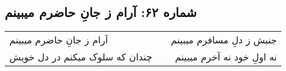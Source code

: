 \begin{center}
\section*{شماره ۶۲: آرام ز جانِ حاضرم میبینم}
\label{sec:062}
\begin{longtable}{l p{0.5cm} r}
آرام ز جانِ حاضرم میبینم
&&
جنبش ز دلِ مسافرم میبینم
\\
چندان که سلوک میکنم در دل خویش
&&
نه اولِ خود نه آخرم میبینم
\\
\end{longtable}
\end{center}
